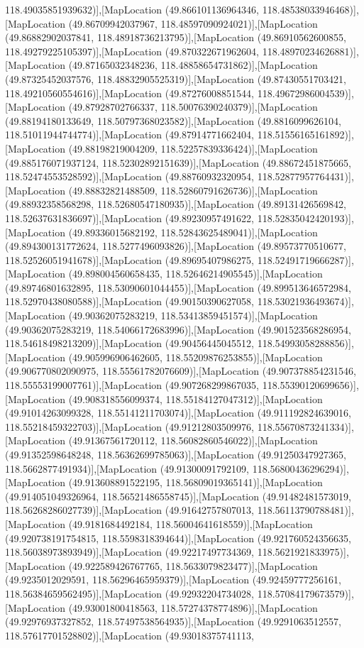 118.49035851939632)],[MapLocation (49.866101136964346, 118.48538033946468)],[MapLocation (49.86709942037967, 118.48597090924021)],[MapLocation (49.86882902037841, 118.48918736213795)],[MapLocation (49.86910562600855, 118.49279225105397)],[MapLocation (49.870322671962604, 118.48970234626881)],[MapLocation (49.87165032348236, 118.48858654731862)],[MapLocation (49.87325452037576, 118.48832905525319)],[MapLocation (49.87430551703421, 118.49210560554616)],[MapLocation (49.87276008851544, 118.49672986004539)],[MapLocation (49.87928702766337, 118.50076390240379)],[MapLocation (49.88194180133649, 118.50797368023582)],[MapLocation (49.8816099626104, 118.51011944744774)],[MapLocation (49.87914771662404, 118.51556165161892)],[MapLocation (49.88198219004209, 118.52257839336424)],[MapLocation (49.885176071937124, 118.52302892151639)],[MapLocation (49.88672451875665, 118.52474553528592)],[MapLocation (49.88760932320954, 118.52877957764431)],[MapLocation (49.88832821488509, 118.52860791626736)],[MapLocation (49.88932358568298, 118.52680547180935)],[MapLocation (49.89131426569842, 118.52637631836697)],[MapLocation (49.89230957491622, 118.52835042420193)],[MapLocation (49.89336015682192, 118.52843625489041)],[MapLocation (49.894300131772624, 118.5277496093826)],[MapLocation (49.89573770510677, 118.52526051941678)],[MapLocation (49.89695407986275, 118.52491719666287)],[MapLocation (49.898004560658435, 118.52646214905545)],[MapLocation (49.89746801632895, 118.53090601044455)],[MapLocation (49.899513646572984, 118.52970438080588)],[MapLocation (49.90150390627058, 118.53021936493674)],[MapLocation (49.90362075283219, 118.53413859451574)],[MapLocation (49.90362075283219, 118.54066172683996)],[MapLocation (49.901523568286954, 118.54618498213209)],[MapLocation (49.90456445045512, 118.54993058288856)],[MapLocation (49.905996906462605, 118.55209876253855)],[MapLocation (49.906770802090975, 118.55561782076609)],[MapLocation (49.907378854231546, 118.55553199007761)],[MapLocation (49.907268299867035, 118.55390120699656)],[MapLocation (49.908318556099374, 118.55184127047312)],[MapLocation (49.91014263099328, 118.55141211703074)],[MapLocation (49.911192824639016, 118.55218459322703)],[MapLocation (49.91212803509976, 118.55670873241334)],[MapLocation (49.91367561720112, 118.56082860546022)],[MapLocation (49.91352598648248, 118.56362699785063)],[MapLocation (49.91250347927365, 118.5662877491934)],[MapLocation (49.91300091792109, 118.56800436296294)],[MapLocation (49.913608891522195, 118.56809019365141)],[MapLocation (49.914051049326964, 118.56521486558745)],[MapLocation (49.91482481573019, 118.56268286027739)],[MapLocation (49.91642757807013, 118.56113790788481)],[MapLocation (49.9181684492184, 118.56004641618559)],[MapLocation (49.920738191754815, 118.5598318394644)],[MapLocation (49.921760524356635, 118.56038973893949)],[MapLocation (49.92217497734369, 118.5621921833975)],[MapLocation (49.922589426767765, 118.5633079823477)],[MapLocation (49.9235012029591, 118.56296465959379)],[MapLocation (49.92459777256161, 118.56384659562495)],[MapLocation (49.92932204734028, 118.57084179673579)],[MapLocation (49.93001800418563, 118.57274378774896)],[MapLocation (49.92976937327852, 118.57497538564935)],[MapLocation (49.9291063512557, 118.57617701528802)],[MapLocation (49.93018375741113, 
